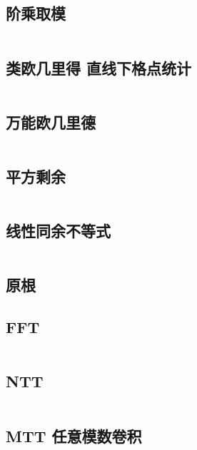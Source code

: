 \documentclass[titlepage, a4paper]{article}
\begin{document}
\begin{multicols}{2}
\begin{spacing}{0.6}
				\subsection{阶乘取模}
					\inputminted{cpp}{src/Math/Factorial Mod.cpp}
				\subsection{类欧几里得 直线下格点统计}
					\inputminted{cpp}{src/Math/直线下格点统计.cpp}
				\subsection{万能欧几里德}
					\inputminted{cpp}{src/zjj/euclid.cpp}
				\subsection{平方剩余}
					\inputminted{cpp}{src/Math/平方剩余.cpp}
				\subsection{线性同余不等式}
					\inputminted{cpp}{src/Math/线性同余不等式.cpp}
				\subsection{原根}
					
				\subsection{FFT}
					\inputminted{cpp}{src/Math/FFT.cpp}
				\subsection{NTT}
					\inputminted{cpp}{src/Math/NTT.cpp}
				\subsection{MTT 任意模数卷积}
					\inputminted{cpp}{src/Math/MTT.cpp}

\end{spacing}
\end{multicols}
\end{document}
